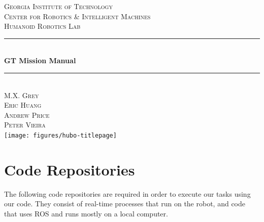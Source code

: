 \documentclass[letterpaper, 10 pt]{report}
\begin{document}
\begin{titlepage}
\center
\textsc{\LARGE Georgia Institute of Technology}\\[1.5cm]
\textsc{\large Center for Robotics \& Intelligent Machines}\\[0.5cm]
\textsc{\large Humanoid Robotics Lab}\\[0.5cm]
\rule{\linewidth}{0.5mm}\\[0.4cm]
{\huge \bfseries GT Mission Manual}\\[0.4cm]
\rule{\linewidth}{0.5mm}\\[1.5cm]
\textsc{\normalsize M.X. Grey}\\
\textsc{\normalsize Eric Huang}\\
\textsc{\normalsize Andrew Price}\\
\textsc{\normalsize Peter Vieira}\\[1.5cm]
\texttt{[image: figures/hubo-titlepage]}
\vfill
\end{titlepage}


\tableofcontents
\newpage


%
\chapter{Code Repositories}\label{chap:code-repos}
The following code repositories are required in order to execute our tasks using our code. They consist of real-time processes that run on the robot, and code that uses ROS and runs mostly on a local computer.
\end{document}
